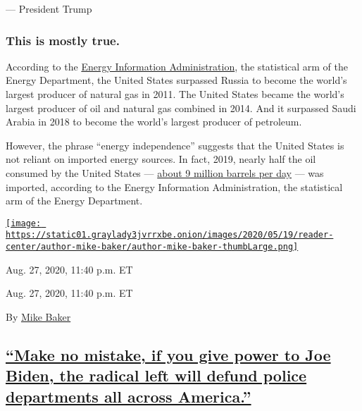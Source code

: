 --- President Trump

\hypertarget{this-is-mostly-true}{%
\subsubsection{This is mostly true.}\label{this-is-mostly-true}}

According to the
\href{https://slack-redir.net/link?url=https\%3A\%2F\%2Fwww.eia.gov\%2Ftodayinenergy\%2Fdetail.php\%3Fid\%3D40973}{Energy
Information Administration}, the statistical arm of the Energy
Department, the United States surpassed Russia to become the world's
largest producer of natural gas in 2011. The United States became the
world's largest producer of oil and natural gas combined in 2014. And it
surpassed Saudi Arabia in 2018 to become the world's largest producer of
petroleum.

However, the phrase ``energy independence'' suggests that the United
States is not reliant on imported energy sources. In fact, 2019, nearly
half the oil consumed by the United States ---
\href{https://slack-redir.net/link?url=https\%3A\%2F\%2Fwww.eia.gov\%2Ftools\%2Ffaqs\%2Ffaq.php\%3Fid\%3D727\%26t\%3D6\%23\%3A~\%3Atext\%3DIn\%25202019\%252C\%2520the\%2520United\%2520States\%2C(including\%2520ethanol\%2520and\%2520biodiesel).}{about
9 million barrels per day} --- was imported, according to the Energy
Information Administration, the statistical arm of the Energy
Department.

\href{https://www.nytimes3xbfgragh.onion/by/mike-baker}{\texttt{[image: https://static01.graylady3jvrrxbe.onion/images/2020/05/19/reader-center/author-mike-baker/author-mike-baker-thumbLarge.png]}}

Aug. 27, 2020, 11:40 p.m. ET

Aug. 27, 2020, 11:40 p.m. ET

By \href{https://www.nytimes3xbfgragh.onion/by/mike-baker}{Mike Baker}

\hypertarget{make-no-mistake-if-you-give-power-to-joe-biden-the-radical-left-will-defund-police-departments-all-across-america}{%
\subsection{\texorpdfstring{\protect\hyperlink{make-no-mistake-if-you-give-power-to-joe-biden-the-radical-left-will-defund-police-departments-all-across-america}{``Make
no mistake, if you give power to Joe Biden, the radical left will defund
police departments all across
America.''}}{``Make no mistake, if you give power to Joe Biden, the radical left will defund police departments all across America.''}}\label{make-no-mistake-if-you-give-power-to-joe-biden-the-radical-left-will-defund-police-departments-all-across-america}}

